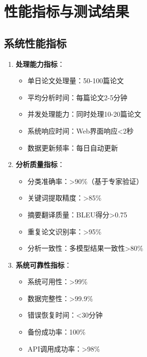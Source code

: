 \documentclass[12pt,a4paper]{article}
\begin{document}
\section{性能指标与测试结果}

\subsection{系统性能指标}
\begin{enumerate}
    \item \textbf{处理能力指标}：
        \begin{itemize}
            \item 单日论文处理量：50-100篇论文
            \item 平均分析时间：每篇论文2-5分钟
            \item 并发处理能力：同时处理10-20篇论文
            \item 系统响应时间：Web界面响应<2秒
            \item 数据更新频率：每日自动更新
        \end{itemize}
    
    \item \textbf{分析质量指标}：
        \begin{itemize}
            \item 分类准确率：>90\%（基于专家验证）
            \item 关键词提取精度：>85\%
            \item 摘要翻译质量：BLEU得分>0.75
            \item 重复论文识别率：>95\%
            \item 分析一致性：多模型结果一致性>80\%
        \end{itemize}
    
    \item \textbf{系统可靠性指标}：
        \begin{itemize}
            \item 系统可用性：>99\%
            \item 数据完整性：>99.9\%
            \item 错误恢复时间：<30分钟
            \item 备份成功率：100\%
            \item API调用成功率：>98\%
        \end{itemize}
\end{enumerate}
\end{document}
